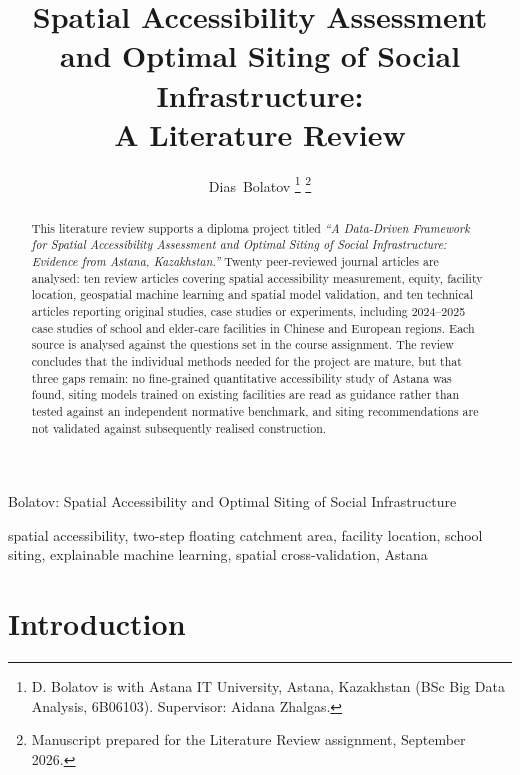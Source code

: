 \documentclass[journal]{IEEEtran}
\begin{document}
\title{Spatial Accessibility Assessment and Optimal Siting of Social Infrastructure:\\ A Literature Review}

\author{Dias~Bolatov%
\thanks{D. Bolatov is with Astana IT University, Astana, Kazakhstan (BSc Big Data Analysis, 6B06103). Supervisor: Aidana Zhalgas.}%
\thanks{Manuscript prepared for the Literature Review assignment, September 2026.}}

%
{Bolatov: Spatial Accessibility and Optimal Siting of Social Infrastructure}

\maketitle

\begin{abstract}
This literature review supports a diploma project titled \emph{``A Data-Driven Framework for Spatial Accessibility Assessment and Optimal Siting of Social Infrastructure: Evidence from Astana, Kazakhstan.''} Twenty peer-reviewed journal articles are analysed: ten review articles covering spatial accessibility measurement, equity, facility location, geospatial machine learning and spatial model validation, and ten technical articles reporting original studies, case studies or experiments, including 2024--2025 case studies of school and elder-care facilities in Chinese and European regions. Each source is analysed against the questions set in the course assignment. The review concludes that the individual methods needed for the project are mature, but that three gaps remain: no fine-grained quantitative accessibility study of Astana was found, siting models trained on existing facilities are read as guidance rather than tested against an independent normative benchmark, and siting recommendations are not validated against subsequently realised construction.
\end{abstract}

\begin{IEEEkeywords}
spatial accessibility, two-step floating catchment area, facility location, school siting, explainable machine learning, spatial cross-validation, Astana
\end{IEEEkeywords}

\IEEEpeerreviewmaketitle

\section{Introduction}
\label{sec:intro}
\end{document}
